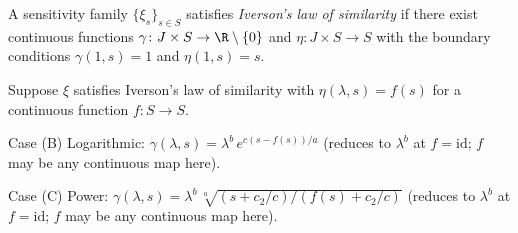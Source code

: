 
A sensitivity family $\{\xi_s\}_{s \in S}$ satisfies \emph{Iverson's law of similarity} if there exist continuous functions $\gamma\colon J \times S \to \R \setminus \{0\}$ and $\eta\colon J \times S \to S$ with the boundary conditions $\gamma(1, s) = 1$ and $\eta(1, s) = s$.

Suppose $\xi$ satisfies Iverson's law of similarity with $\eta(\lambda, s) = f(s)$ for a continuous function $f\colon S \to S$.

Case (B) Logarithmic: $\gamma(\lambda, s) = \lambda^b\, e^{c(s - f(s))/a}$ (reduces to $\lambda^b$ at $f = \mathrm{id}$; $f$ may be any continuous map here).

Case (C) Power: $\gamma(\lambda, s) = \lambda^b\, \sqrt[a]{(s + c_2/c)/(f(s) + c_2/c)}$ (reduces to $\lambda^b$ at $f = \mathrm{id}$; $f$ may be any continuous map here).
